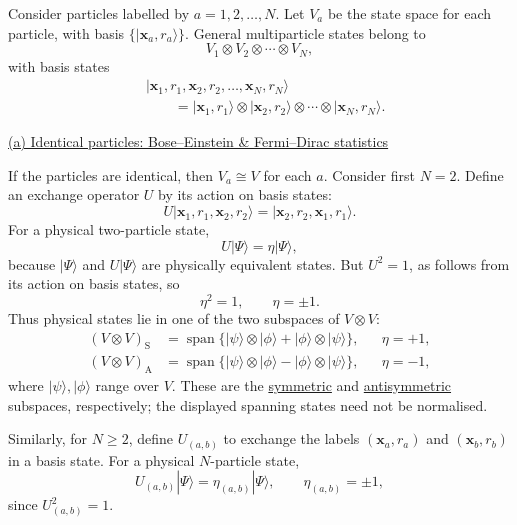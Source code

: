 \documentclass[11pt,a4paper]{article}
\begin{document}
Consider particles labelled by $a=1,2,\ldots,N$. Let $V_a$ be the
state space for each particle, with basis
$\{|\mathbf{x}_a,r_a\rangle\}$. General multiparticle states belong to
\[
    V_1\otimes V_2\otimes\cdots\otimes V_N,
\]
with basis states
\begin{align*}
    &|\mathbf{x}_1,r_1,\mathbf{x}_2,r_2,\ldots,\mathbf{x}_N,r_N\rangle\\
    &\qquad=|\mathbf{x}_1,r_1\rangle\otimes|\mathbf{x}_2,r_2\rangle
        \otimes\cdots\otimes|\mathbf{x}_N,r_N\rangle.
\end{align*}

\medskip
\noindent
\underline{(a) Identical particles: Bose--Einstein \& Fermi--Dirac statistics}

If the particles are identical, then $V_a\cong V$ for each $a$.
Consider first $N=2$. Define an exchange operator $U$ by its action
on basis states:
\[
    U|\mathbf{x}_1,r_1,\mathbf{x}_2,r_2\rangle
      =|\mathbf{x}_2,r_2,\mathbf{x}_1,r_1\rangle.
\]
For a physical two-particle state,
\[
    U|\Psi\rangle=\eta|\Psi\rangle,
\]
because $|\Psi\rangle$ and $U|\Psi\rangle$ are physically equivalent
states. But $U^2=1$, as follows from its action on basis states, so
\[
    \eta^2=1,\qquad\eta=\pm1.
\]
Thus physical states lie in one of the two subspaces of $V\otimes V$:
\begin{align*}
    (V\otimes V)_{\mathrm{S}}
        &=\operatorname{span}\bigl\{
          |\psi\rangle\otimes|\phi\rangle
          +|\phi\rangle\otimes|\psi\rangle\bigr\},
        &&\eta=+1,\\
    (V\otimes V)_{\mathrm{A}}
        &=\operatorname{span}\bigl\{
          |\psi\rangle\otimes|\phi\rangle
          -|\phi\rangle\otimes|\psi\rangle\bigr\},
        &&\eta=-1,
\end{align*}
where $|\psi\rangle,|\phi\rangle$ range over $V$. These are the
\underline{symmetric} and \underline{antisymmetric} subspaces,
respectively; the displayed spanning states need not be normalised.

Similarly, for $N\geq2$, define $U_{(a,b)}$ to exchange the labels
$(\mathbf{x}_a,r_a)$ and $(\mathbf{x}_b,r_b)$ in a basis state.
For a physical $N$-particle state,
\[
    U_{(a,b)}|\Psi\rangle=\eta_{(a,b)}|\Psi\rangle,
    \qquad\eta_{(a,b)}=\pm1,
\]
since $U_{(a,b)}^2=1$.
\end{document}
